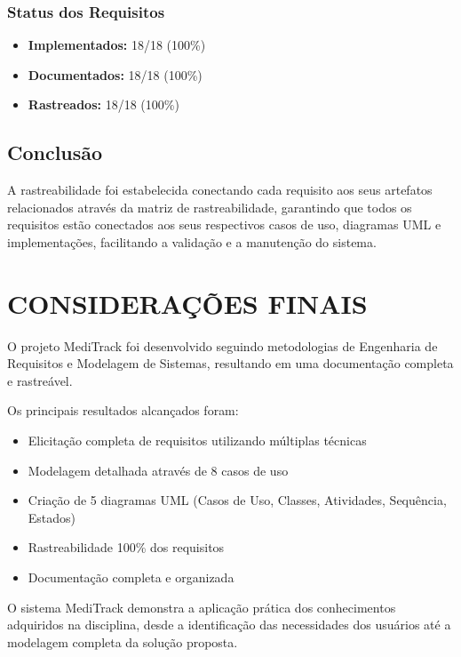 \documentclass[12pt]{article}
\begin{document}
\subsubsection{Status dos Requisitos}

\begin{itemize}
    \item \textbf{Implementados:} 18/18 (100\%)
    \item \textbf{Documentados:} 18/18 (100\%)
    \item \textbf{Rastreados:} 18/18 (100\%)
\end{itemize}

\subsection{Conclusão}

A rastreabilidade foi estabelecida conectando cada requisito aos seus artefatos relacionados através da matriz de rastreabilidade, garantindo que todos os requisitos estão conectados aos seus respectivos casos de uso, diagramas UML e implementações, facilitando a validação e a manutenção do sistema.

\newpage

\section{CONSIDERAÇÕES FINAIS}

O projeto MediTrack foi desenvolvido seguindo metodologias de Engenharia de Requisitos e Modelagem de Sistemas, resultando em uma documentação completa e rastreável.

Os principais resultados alcançados foram:
\begin{itemize}
    \item[$\checkmark$] Elicitação completa de requisitos utilizando múltiplas técnicas
    \item[$\checkmark$] Modelagem detalhada através de 8 casos de uso
    \item[$\checkmark$] Criação de 5 diagramas UML (Casos de Uso, Classes, Atividades, Sequência, Estados)
    \item[$\checkmark$] Rastreabilidade 100\% dos requisitos
    \item[$\checkmark$] Documentação completa e organizada
\end{itemize}

O sistema MediTrack demonstra a aplicação prática dos conhecimentos adquiridos na disciplina, desde a identificação das necessidades dos usuários até a modelagem completa da solução proposta.
\end{document}
